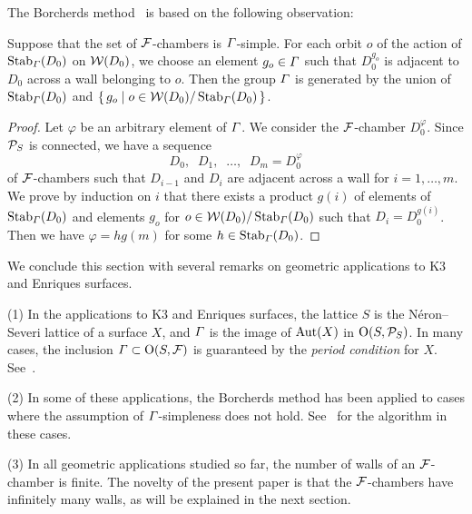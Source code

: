 \documentclass{amsart} %
\begin{document}
The Borcherds method~\cite{MR913200, MR1654763} is 
based on the following observation:
%
\begin{proposition}\label{prop:observation}
Suppose that the set of $\mathord{\mathcal{F}}$-chambers is $\varGamma$-simple.
For each orbit $o$ of the action of $\operatorname{Stab}_{\varGamma}(D_0)$ on $\mathord{\mathcal{W}}(D_0)$,
we choose an element $g_o\in \varGamma$ such that
$D_0^{g_o}$ is adjacent to $D_0$ across a wall
belonging to $o$.
Then the group $\varGamma$ is generated by the union of 
$\operatorname{Stab}_{\varGamma}(D_0)$ and $\{\,{g_o}\mid {o\in \mathord{\mathcal{W}}(D_0)/\operatorname{Stab}_{\varGamma}(D_0)} \,\}$.
\end{proposition}
%
\begin{proof}
Let $\varphi$ be an arbitrary element of $\varGamma$.
We consider the $\mathord{\mathcal{F}}$-chamber $D_0^{\varphi}$.
Since $\mathord{\mathcal{P}}_S$ is connected, 
we have a sequence
\[
D_0, \;\; D_1, \;\; \dots, \;\; D_m=D_0^{\varphi}
\]
of $\mathord{\mathcal{F}}$-chambers such that $D_{i-1}$ and $D_i$ are 
adjacent across a wall for $i=1, \dots, m$.
We prove by induction on $i$ that there exists 
a product $g(i)$ of elements of $\operatorname{Stab}_{\varGamma}(D_0)$ and 
 elements $g_o$ for $o\in \mathord{\mathcal{W}}(D_0)/\operatorname{Stab}_{\varGamma}(D_0)$
such that $D_i=D_0^{g(i)}$.
Then we have $\varphi=h g(m) $ for some $h\in \operatorname{Stab}_{\varGamma}(D_0)$.
\end{proof}
%
We conclude this section with several remarks on geometric applications
to K3 and Enriques surfaces. 
%
\begin{remark}\label{rem:geom}
(1) 
In the applications to K3 and Enriques surfaces, 
the lattice $S$ is the N\'eron--Severi lattice of a surface $X$,
and $\varGamma$ is the image of $\operatorname{Aut}(X)$ in $\mathord{\mathrm{O}}(S,\mathord{\mathcal{P}}_S)$.
In many cases, the inclusion
$\varGamma \subset \mathord{\mathrm{O}}(S,\mathord{\mathcal{F}})$
is guaranteed by the \emph{period condition} for $X$.
See~\cite[Section~5.2]{MR4759604}.
\par
(2) 
In some of these applications, 
the Borcherds method has been applied to cases where 
the assumption of $\varGamma$-simpleness does not hold.
See~\cite[Section 5.1]{MR4759604} for the algorithm
in these cases.
%
\par
(3) 
In all geometric applications studied so far,
the number of walls of an $\mathord{\mathcal{F}}$-chamber is finite.
The novelty of the present paper is that
the $\mathord{\mathcal{F}}$-chambers have infinitely many walls,
as will be explained in the next section.
\end{remark}
%
%
\end{document}
